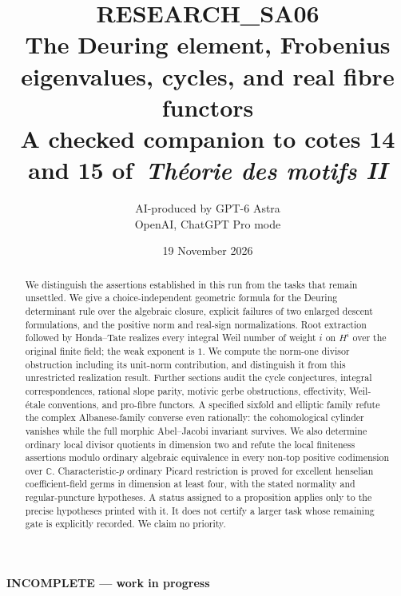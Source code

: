 \documentclass[11pt,a4paper]{article}
\title{\textbf{RESEARCH\_SA06}\\[5pt]
The Deuring element, Frobenius eigenvalues, cycles, and real fibre functors\\[5pt]
\large A checked companion to cotes 14 and 15 of\
\emph{Théorie des motifs II}}
\author{AI-produced by GPT-6 Astra\\OpenAI, ChatGPT Pro mode}
\date{19 November 2026}
\begin{document}
\maketitle
\begin{center}\textbf{INCOMPLETE --- work in progress}\end{center}
\begin{abstract}
We distinguish the assertions established in this run from the tasks that
remain unsettled. We give a choice-independent geometric formula for the
Deuring determinant rule over the algebraic closure, explicit failures of
two enlarged descent formulations, and the positive norm and real-sign
normalizations. Root extraction followed by Honda--Tate realizes every
integral Weil number of weight $i$ on $H^i$ over the original finite field;
the weak exponent is $1$. We compute the norm-one divisor obstruction
including its unit-norm contribution, and distinguish it from this
unrestricted realization result. Further sections audit the cycle
conjectures, integral correspondences, rational slope parity, motivic
gerbe obstructions, effectivity, Weil-étale conventions, and pro-fibre
functors. A specified sixfold and elliptic family refute the complex
Albanese-family converse even rationally: the cohomological cylinder
vanishes while the full morphic Abel--Jacobi invariant survives.
We also determine ordinary local divisor quotients in dimension two
and refute the local finiteness assertions modulo ordinary algebraic
equivalence in every non-top positive codimension over $\mathbb C$.
Characteristic-$p$ ordinary Picard restriction is proved for excellent
henselian coefficient-field germs in dimension at least four, with the
stated normality and regular-puncture hypotheses.
A status assigned to a proposition applies only to the precise
hypotheses printed with it. It does not certify a larger task whose
remaining gate is explicitly recorded. We claim no priority.
\end{abstract}
\end{document}
